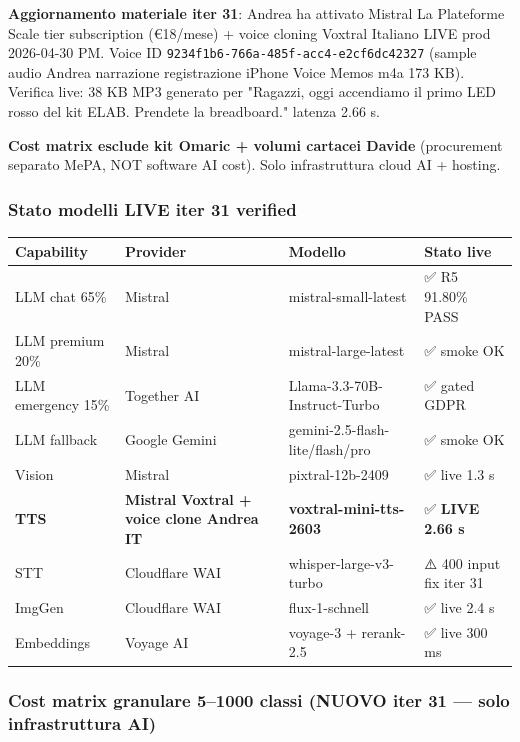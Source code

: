 \documentclass[12pt,a4paper]{article}
\begin{document}
\textbf{Aggiornamento materiale iter 31}: Andrea ha attivato Mistral La Plateforme Scale tier subscription (€18/mese) + voice cloning Voxtral Italiano LIVE prod 2026-04-30 PM. Voice ID \texttt{9234f1b6-766a-485f-acc4-e2cf6dc42327} (sample audio Andrea narrazione registrazione iPhone Voice Memos m4a 173 KB). Verifica live: 38 KB MP3 generato per "Ragazzi, oggi accendiamo il primo LED rosso del kit ELAB. Prendete la breadboard." latenza 2.66 s.

\textbf{Cost matrix esclude kit Omaric + volumi cartacei Davide} (procurement separato MePA, NOT software AI cost). Solo infrastruttura cloud AI + hosting.

\subsubsection*{Stato modelli LIVE iter 31 verified}

\begin{center}
\begin{tabular}{llll}
\toprule
\textbf{Capability} & \textbf{Provider} & \textbf{Modello} & \textbf{Stato live} \\
\midrule
LLM chat 65\% & Mistral & mistral-small-latest & ✅ R5 91.80\% PASS \\
LLM premium 20\% & Mistral & mistral-large-latest & ✅ smoke OK \\
LLM emergency 15\% & Together AI & Llama-3.3-70B-Instruct-Turbo & ✅ gated GDPR \\
LLM fallback & Google Gemini & gemini-2.5-flash-lite/flash/pro & ✅ smoke OK \\
Vision & Mistral & pixtral-12b-2409 & ✅ live 1.3 s \\
\textbf{TTS} & \textbf{Mistral Voxtral + voice clone Andrea IT} & \textbf{voxtral-mini-tts-2603} & ✅ \textbf{LIVE 2.66 s} \\
STT & Cloudflare WAI & whisper-large-v3-turbo & ⚠️ 400 input fix iter 31 \\
ImgGen & Cloudflare WAI & flux-1-schnell & ✅ live 2.4 s \\
Embeddings & Voyage AI & voyage-3 + rerank-2.5 & ✅ live 300 ms \\
\bottomrule
\end{tabular}
\end{center}

\subsubsection*{Cost matrix granulare 5--1000 classi (NUOVO iter 31 — solo infrastruttura AI)}
\end{document}
